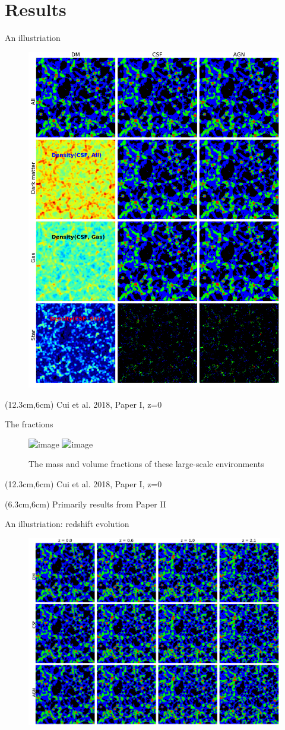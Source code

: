 \documentclass[aspectratio=1610]{beamer}
\begin{document}
\section{Results}
\begin{frame}{An illustriation}
  \begin{figure}
    \includegraphics[width=0.33\linewidth]{image_show_V}
  \end{figure}
  \begin{textblock*}{4cm}(12.3cm,6cm)
    {Cui et al. 2018, Paper I, z=0}
  \end{textblock*}
\end{frame}

\begin{frame}{The fractions}
  \begin{figure}
    \includegraphics<1>[width=\linewidth]{Fractions-BE}
    \includegraphics<2>[width=\linewidth]{Fractions-gasweb}
    \caption{The mass and volume fractions of these large-scale environments}
  \end{figure}
  \begin{textblock*}{4cm}(12.3cm,6cm)
    {Cui et al. 2018, Paper I, z=0}
  \end{textblock*}
\end{frame}

\begin{frame}
  \begin{textblock*}{8cm}(6.3cm,6cm)
    {\Huge Primarily results from Paper II}
  \end{textblock*}
\end{frame}

\begin{frame}{An illustriation: redshift evolution}
  \begin{figure}
    \includegraphics[width=0.6\linewidth]{Evolution-illustriation}
  \end{figure}
\end{frame}
\end{document}

